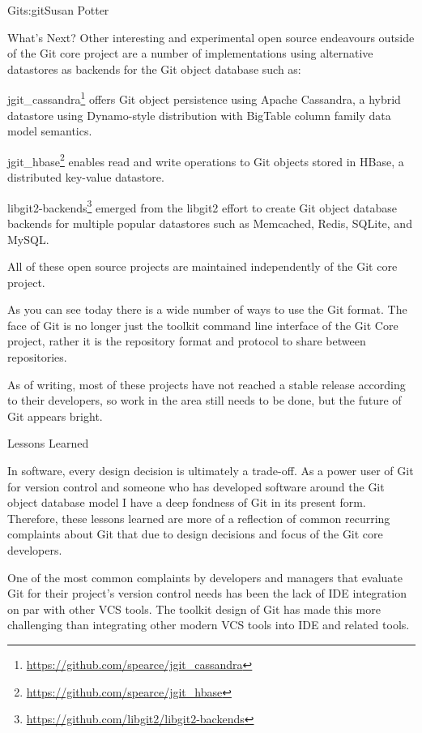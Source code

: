 \begin{aosachapter}{Git}{s:git}{Susan Potter}
\begin{aosasect1}{What's Next?}
Other interesting and experimental open source endeavours outside of the
Git core project are a number of implementations using alternative datastores
as backends for the Git object database such as:
\begin{aosaitemize}
  \item jgit\_cassandra\footnote{\url{https://github.com/spearce/jgit\_cassandra}}
    offers Git object persistence using Apache Cassandra, a hybrid datastore
    using Dynamo-style distribution with BigTable column family data model
    semantics.
  \item jgit\_hbase\footnote{\url{https://github.com/spearce/jgit\_hbase}}
    enables read and write operations to Git objects stored in HBase, a
    distributed key-value datastore.
  \item libgit2-backends\footnote{\url{https://github.com/libgit2/libgit2-backends}}
    emerged from the libgit2 effort to create Git object database
    backends for multiple popular datastores such as Memcached, Redis,
    SQLite, and MySQL.
\end{aosaitemize}

All of these open source projects are maintained independently of the Git
core project.

As you can see today there is a wide number of ways to use the Git format.
The face of Git is no longer just the toolkit command line interface of
the Git Core project, rather it is the repository format and protocol to
share between repositories.

As of writing, most of these projects have not reached a stable release
according to their developers, so work in the area still needs to be done,
but the future of Git appears bright.

\end{aosasect1}

\begin{aosasect1}{Lessons Learned}

In software, every design decision is ultimately a trade-off. As a power
user of Git for version control and someone who has developed software
around the Git object database model I have a deep fondness of Git in its
present form. Therefore, these lessons learned are more of a reflection
of common recurring complaints about Git that due to design decisions and
focus of the Git core developers.

One of the most common complaints by developers and managers that evaluate
Git for their project's version control needs has been the lack of IDE
integration on par with other VCS tools. The toolkit design of Git has made
this more challenging than integrating other modern VCS tools into IDE
and related tools.


\end{aosasect1}
\end{aosachapter}
